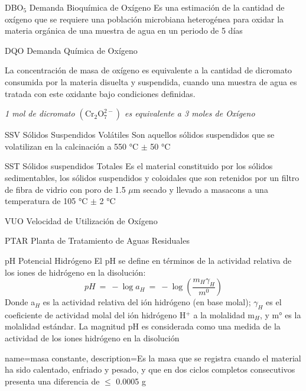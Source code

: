 {DBO$_{5}$}            %
{Demanda Bioquímica de Oxígeno}  %
{Es una estimación de la cantidad de oxígeno que se requiere una población microbiana heterogénea para oxidar la materia orgánica de una muestra de agua en un periodo de 5 días} %

{DQO}
{Demanda Química de Oxígeno}
{La concentración de masa de oxígeno es equivalente a la cantidad de dicromato consumida por la materia disuelta y suspendida, cuando una muestra de agua es tratada con este oxidante bajo condiciones definidas.
\begin{center}
	\emph{1 mol de dicromato $\mathrm{(Cr_{2}O_{7}^{2-})}$ es equivalente a 3 moles de Oxígeno}
\end{center}
}

{SSV}
{Sólidos Suspendidos Volátiles}
{Son aquellos sólidos suspendidos que se volatilizan en la calcinación a 550 °C $\pm$ 50 °C}

{SST}
{Sólidos suspendidos Totales}
{Es el material constituido por los sólidos sedimentables, los sólidos suspendidos y coloidales que son retenidos por un filtro de fibra de vidrio con poro de 1.5 $\mu$m secado y llevado a \gls{masacons} a una temperatura de 105 °C $\pm$ 2 °C}

{VUO}
{Velocidad de Utilización de Oxígeno}
{}

{PTAR}
{Planta de Tratamiento de Aguas Residuales}
{}

{pH}
{Potencial Hidrógeno}
{El pH se define en términos de la actividad relativa de los iones de hidrógeno en la disolución:
$$pH\ =\ -\log a_{H}\ =\ -\log (\frac{m_{H}\gamma_{H}}{m^{0}})$$
Donde a$_{H}$ es la actividad relativa del ión hidrógeno (en base molal); $\gamma_{H}$ es el coeficiente de actividad molal del ión hidrógeno H$^{+}$ a la molalidad m$_{H}$, y m° es la molalidad estándar. La magnitud pH es considerada como una medida de la actividad de los iones hidrógeno en la disolución}

{
	name={masa constante},
	description={Es la masa que se registra cuando el material ha sido calentado, enfriado y pesado, y que en dos ciclos completos consecutivos presenta una diferencia de $\leq$ 0.0005 g}
}